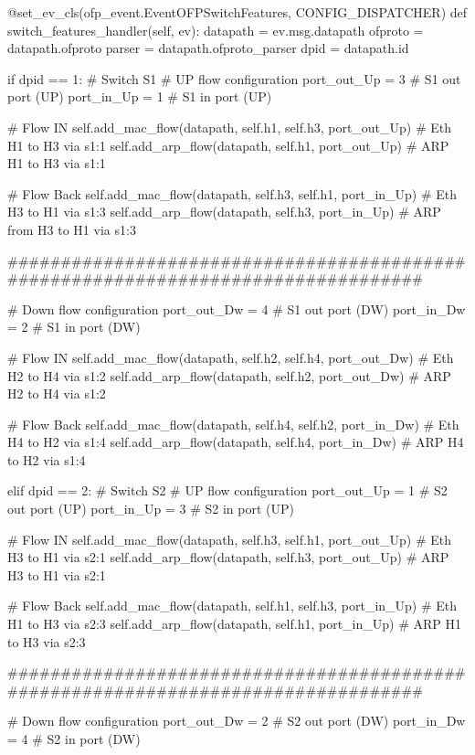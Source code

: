 \begin{pythoncode}
@set_ev_cls(ofp_event.EventOFPSwitchFeatures, CONFIG_DISPATCHER)
def switch_features_handler(self, ev):
    datapath = ev.msg.datapath
    ofproto = datapath.ofproto
    parser = datapath.ofproto_parser
    dpid = datapath.id

    if dpid == 1: # Switch S1
        # UP flow configuration
        port_out_Up = 3 # S1 out port (UP)
        port_in_Up = 1 # S1 in port (UP)

        # Flow IN
        self.add_mac_flow(datapath, self.h1, self.h3, port_out_Up) # Eth H1 to H3 via s1:1 
        self.add_arp_flow(datapath, self.h1, port_out_Up) # ARP  H1 to H3 via s1:1

        # Flow Back
        self.add_mac_flow(datapath, self.h3, self.h1, port_in_Up) # Eth H3 to H1 via s1:3
        self.add_arp_flow(datapath, self.h3, port_in_Up) # ARP from H3  to H1 via s1:3
        
        ##################################################################################
        
        # Down flow configuration 
        port_out_Dw = 4 # S1 out port (DW)
        port_in_Dw = 2 # S1 in port (DW)
        
        # Flow IN
        self.add_mac_flow(datapath, self.h2, self.h4, port_out_Dw) # Eth H2 to H4 via s1:2
        self.add_arp_flow(datapath, self.h2, port_out_Dw) # ARP H2 to H4 via s1:2

        # Flow Back
        self.add_mac_flow(datapath, self.h4, self.h2, port_in_Dw) # Eth H4 to H2 via s1:4
        self.add_arp_flow(datapath, self.h4, port_in_Dw) # ARP H4 to H2 via s1:4

    elif dpid == 2: # Switch S2
        # UP flow configuration
        port_out_Up = 1 # S2 out port (UP)
        port_in_Up = 3 # S2 in port (UP)

        # Flow IN
        self.add_mac_flow(datapath, self.h3, self.h1, port_out_Up) # Eth H3 to H1 via s2:1
        self.add_arp_flow(datapath, self.h3, port_out_Up) # ARP H3 to H1 via s2:1

        # Flow Back
        self.add_mac_flow(datapath, self.h1, self.h3, port_in_Up) # Eth H1 to H3 via s2:3
        self.add_arp_flow(datapath, self.h1, port_in_Up) # ARP H1 to H3 via s2:3

        ##################################################################################

        # Down flow configuration
        port_out_Dw = 2 # S2 out port (DW)
        port_in_Dw = 4 # S2 in port (DW)
        

\end{pythoncode}
